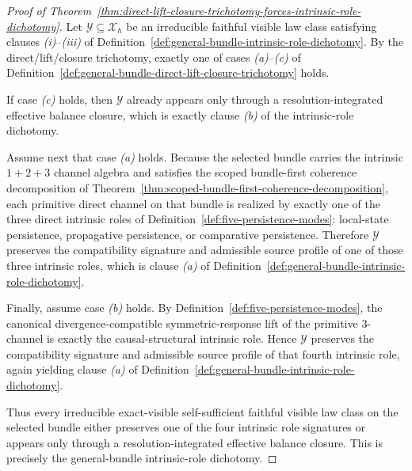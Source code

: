 \begin{proof}[Proof of Theorem~\ref{thm:direct-lift-closure-trichotomy-forces-intrinsic-role-dichotomy}]
\label{proof:thm:direct-lift-closure-trichotomy-forces-intrinsic-role-dichotomy}
Let \(\mathcal Y\subseteq \mathcal X_h\) be an irreducible faithful visible law
class satisfying clauses \emph{(i)}--\emph{(iii)} of
Definition~\ref{def:general-bundle-intrinsic-role-dichotomy}. By the
direct/lift/closure trichotomy, exactly one of cases \emph{(a)}--\emph{(c)} of
Definition~\ref{def:general-bundle-direct-lift-closure-trichotomy} holds.

If case \emph{(c)} holds, then \(\mathcal Y\) already appears only through a
resolution-integrated effective balance closure, which is exactly clause
\emph{(b)} of the intrinsic-role dichotomy.

Assume next that case \emph{(a)} holds. Because the selected bundle carries
the intrinsic \(1+2+3\) channel algebra and satisfies the scoped bundle-first
coherence decomposition of
Theorem~\ref{thm:scoped-bundle-first-coherence-decomposition}, each primitive
direct channel on that bundle is realized by exactly one of the three direct
intrinsic roles of
Definition~\ref{def:five-persistence-modes}: local-state persistence,
propagative persistence, or comparative persistence. Therefore \(\mathcal Y\)
preserves the compatibility signature and admissible source profile of one of
those three intrinsic roles, which is clause \emph{(a)} of
Definition~\ref{def:general-bundle-intrinsic-role-dichotomy}.

Finally, assume case \emph{(b)} holds. By
Definition~\ref{def:five-persistence-modes}, the canonical
divergence-compatible symmetric-response lift of the primitive \(3\)-channel is
exactly the causal-structural intrinsic role. Hence \(\mathcal Y\) preserves
the compatibility signature and admissible source profile of that fourth
intrinsic role, again yielding clause \emph{(a)} of
Definition~\ref{def:general-bundle-intrinsic-role-dichotomy}.

Thus every irreducible exact-visible self-sufficient faithful visible law class
on the selected bundle either preserves one of the four intrinsic role
signatures or appears only through a resolution-integrated effective balance
closure. This is precisely the general-bundle intrinsic-role dichotomy.
\end{proof}

